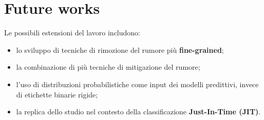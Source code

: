 \section{Future works}

Le possibili estensioni del lavoro includono:

\begin{itemize}
    \item lo sviluppo di tecniche di rimozione del rumore più \textbf{fine-grained};
    \item la combinazione di più tecniche di mitigazione del rumore;
    \item l'uso di distribuzioni probabilistiche come input dei modelli predittivi, invece di etichette binarie rigide;
    \item la replica dello studio nel contesto della classificazione \textbf{Just-In-Time (JIT)}.
\end{itemize}